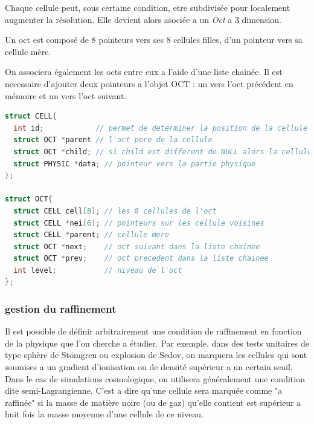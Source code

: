 Chaque cellule peut, sous certaine condition, etre subdivisée pour localement augmenter la résolution.
Elle devient alors asociée a un \emph{Oct} a 3 dimension.

Un oct est composé de 8 pointeurs vers ses 8 cellules filles, d'un pointeur vers sa cellule mère.

On associera également les octs entre eux a l'aide d'une liste chainée. 
Il est necessaire d'ajouter deux pointeurs a l'objet OCT : un vers l'oct précédent en mémoire et un vers l'oct suivant.


\begin{lstlisting}[float=bth,language=C,frame=tb,caption={les structures CELL et OCT de EMMA},label=lst:celloct]
struct CELL{
  int id;            // permet de determiner la position de la cellule dans l'oct
  struct OCT *parent // l'oct pere de la cellule
  struct OCT *child; // si child est different de NULL alors la cellule est raffinee et child point vers l'oct enfant
  struct PHYSIC *data; // pointeur vers la partie physique
};

struct OCT{
  struct CELL cell[8]; // les 8 cellules de l'oct
  struct CELL *nei[6]; // pointeurs sur les cellule voisines
  struct CELL *parent; // cellule mere
  struct OCT *next;    // oct suivant dans la liste chainee
  struct OCT *prev;    // oct precedent dans la liste chainee
  int level;           // niveau de l'oct
};
\end{lstlisting}





\subsubsection{gestion du raffinement}

Il est possible de définir arbitrairement une condition de raffinement en fonction de la physique que l'on cherche a étudier.
Par exemple, dans des tests unitaires de type sphère de Stömgren ou explosion de Sedov, on marquera les cellules qui sont soumises a un gradient d'ionisation ou de densité supérieur a un certain seuil.
Dans le cas de simulations cosmologique, on utilisera généralement une condition dite semi-Lagrangienne.
C'est a dire qu'une cellule sera marquée comme "a raffinée" si la masse de matière noire (ou de gaz) qu'elle contient est supérieur a huit fois la masse moyenne d'une cellule de ce niveau.



